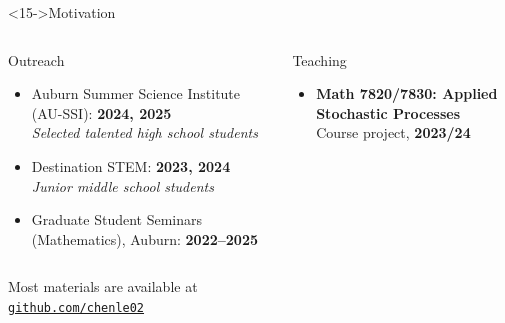 \documentclass[9pt,table,xcolor=dvipsnames]{beamer}
\begin{document}
\begin{frame}[noframenumbering] %
  \titlepage
\end{frame}

\begin{frame}<15->{Motivation}
  \small  %

  \begin{columns}[T,onlytextwidth]
    \begin{block}{Outreach}
      \begin{itemize}\itemsep2pt
        \item Auburn Summer Science Institute (AU-SSI): \textbf{2024, 2025}\\
              \emph{Selected talented high school students}
        \item Destination STEM: \textbf{2023, 2024}\\
              \emph{Junior middle school students}
        \item Graduate Student Seminars (Mathematics), Auburn: \textbf{2022--2025}
      \end{itemize}
    \end{block}

    \begin{block}{Teaching}
      \begin{itemize}\itemsep2pt
        \item \textbf{Math 7820/7830: Applied Stochastic Processes}\\
              Course project, \textbf{2023/24}
      \end{itemize}
    \end{block}

  \end{columns}
  \vfill
  \begin{center}
    Most materials are available at \\ \bigskip
    \href{https://github.com/chenle02/}{\texttt{github.com/chenle02}}%
  \end{center}
\end{frame}
\end{document}
